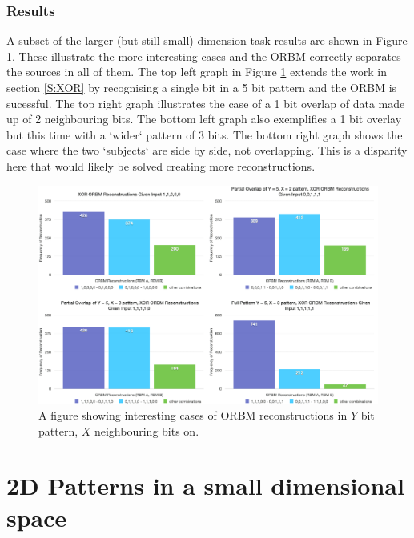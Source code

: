 \subsubsection{Results}

A subset of the larger (but still small) dimension task results are shown in Figure \ref{F:X-Bit-ORBM-Inference-Results-1}. These illustrate the more interesting cases and the ORBM correctly separates the sources in all of them. The top left graph in Figure \ref{F:X-Bit-ORBM-Inference-Results-1} extends the work in section \ref{S:XOR} by recognising a single bit in a 5 bit pattern and the ORBM is sucessful. The top right graph illustrates the case of a 1 bit overlap of data made up of 2 neighbouring bits. The bottom left graph also exemplifies a 1 bit overlay but this time with a `wider` pattern of 3 bits. The bottom right graph shows the case where the two `subjects` are side by side, not overlapping. This is a disparity here that would likely be solved creating more reconstructions.


\begin{landscape}
\begin{figure}
  \begin{center}
    \includegraphics[height=0.9\textheight]{Assets/results/xy-bit-results}
  \end{center}
  \caption{A figure showing interesting cases of ORBM reconstructions in $Y$ bit pattern, $X$ neighbouring bits on.}

  \label{F:X-Bit-ORBM-Inference-Results-1}
\end{figure}
\end{landscape}

\section{2D Patterns in a small dimensional space}

